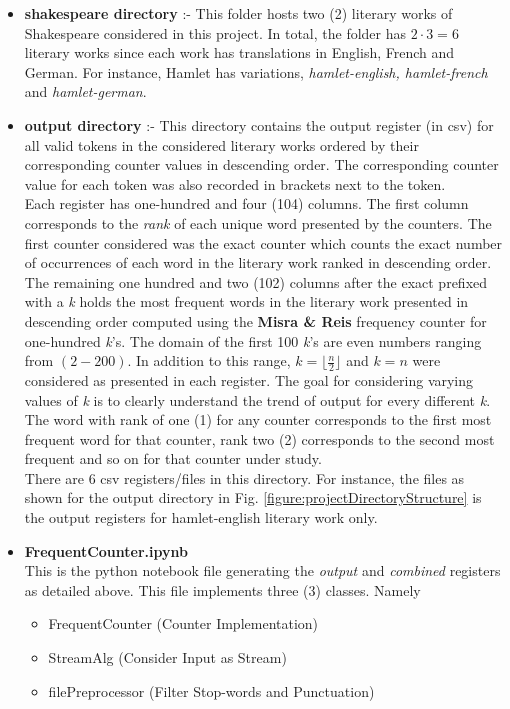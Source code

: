 \documentclass[longpaper, english, final, times]{revdetua}
\begin{document}
		\begin{itemize}
			\setlength\itemsep{1em}
			\item \textbf{shakespeare directory} :- This folder hosts two (2) literary works of Shakespeare considered in this project. In total, the folder has $2\cdot 3=6$ literary works since each work has translations in English, French and German. For instance, Hamlet has variations, \textit{hamlet-english, hamlet-french} and \textit{hamlet-german}.
			\item \textbf{output directory} :- This directory contains the output register (in csv) for all valid tokens in the considered literary works ordered by their corresponding counter values in descending order. The corresponding counter value for each token was also recorded in brackets next to the token. \\
			
			Each register has one-hundred and four (104) columns. The first column corresponds to the \textit{rank} of each unique word presented by the counters. The first counter considered was the exact counter which counts the exact number of occurrences of each word in the literary work ranked in descending order. The remaining one hundred and two (102) columns after the exact prefixed with a \textit{k} holds the most frequent words in the literary work presented in descending order computed using the \textbf{Misra \& Reis} \cite{misra_gries} frequency counter for one-hundred \textit{k}'s. The domain of the first 100 \textit{k}'s are even numbers ranging from $(2-200)$. In addition to this range, $k=\lfloor \frac{n}{2} \rfloor$ and $k=n$ were considered as presented in each register. The goal for considering varying values of \textit{k} is to clearly understand the trend of output for every different \textit{k}. The word with rank of one (1) for any counter corresponds to the first most frequent word for that counter, rank two (2) corresponds to the second most frequent and so on for that counter under study.\\
			
			There are $6$ csv registers/files in this directory. For instance, the files as shown for the output directory in Fig. \ref{figure:projectDirectoryStructure} is the output registers for hamlet-english literary work only.
			
			\item \textbf{FrequentCounter.ipynb} \\
				This is the python notebook file generating the \textit{output} and \textit{combined} registers as detailed above. This file implements three (3) classes. Namely
				\begin{itemize}
					\setlength\itemsep{0em}
					\item FrequentCounter (Counter Implementation)
					\item StreamAlg (Consider Input as Stream)
					\item filePreprocessor (Filter Stop-words and Punctuation)
				\end{itemize}
		\end{itemize}
	
\end{document}

